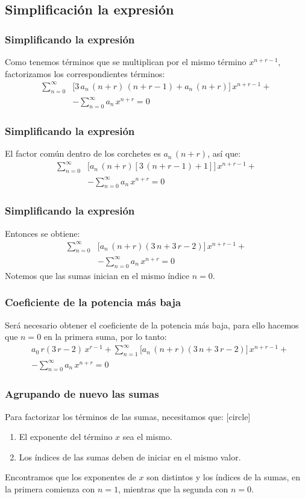 \documentclass[12pt]{beamer}
\begin{document}
\subsection*{Simplificación la expresión}

\begin{frame}
\frametitle{Simplificando la expresión}
Como tenemos términos que se multiplican por el mismo término $x^{n+r-1}$, factorizamos los correspondientes términos:
\pause
\begin{align*}
\sum_{n=0}^{\infty} &\bigg[ 3 \, a_{n} \, (n + r) \, (n + r - 1) + a_{n} \, (n + r) \bigg] \, x^{n+r-1} + \\[1em]
&- \sum_{n=0}^{\infty} a_{n} \, x^{n+r} = 0
\end{align*}
\end{frame}
\begin{frame}
\frametitle{Simplificando la expresión}
El factor común dentro de los corchetes es $a_{n} \, (n + r)$, así que:
\pause
\begin{align*}
\sum_{n=0}^{\infty} &\bigg[ a_{n} \, (n + r) [3 \, (n + r - 1) + 1 ] \bigg] \, x^{n+r-1} + \\[1em]
&- \sum_{n=0}^{\infty} a_{n} \, x^{n+r} = 0
\end{align*}
\end{frame}
\begin{frame}
\frametitle{Simplificando la expresión}
Entonces se obtiene:
\pause
\begin{align*}
\sum_{n=0}^{\infty} &\bigg[ a_{n} \, (n + r) (3 \, n +  3 \, r - 2 ) \bigg] \, x^{n+r-1} + \\[1em]
&- \sum_{n=0}^{\infty} a_{n} \, x^{n+r} = 0
\end{align*}
\pause
Notemos que las sumas inician en el mismo índice $n = 0$.
\end{frame}
\begin{frame}
\frametitle{Coeficiente de la potencia más baja}
Será necesario obtener el coeficiente de la potencia más baja, para ello hacemos que $n = 0$ en la primera suma, por lo tanto:
\begin{align*}
&a_{0} \, r (3 \, r {-}  2) \, x^{r-1} + \sum_{n=1}^{\infty} \bigg[ a_{n} \, (n {+} r) (3 \, n {+}  3 \, r {-} 2 ) \bigg] \, x^{n+r-1} + \\[1em]
&- \sum_{n=0}^{\infty} a_{n} \, x^{n+r} = 0
\end{align*}
\end{frame}
\begin{frame}
\frametitle{Agrupando de nuevo las sumas}
Para factorizar los términos de las sumas, necesitamos que:
[circle]
\begin{enumerate}[<+->]
\item El exponente del término $x$ sea el mismo.
\item Los índices de las sumas deben de iniciar en el mismo valor.
\end{enumerate}
\pause
Encontramos que los exponentes de $x$ son distintos y los índices de la sumas, en la primera comienza con $n = 1$, mientras que la segunda con $n = 0$.
\end{frame}
\end{document}
